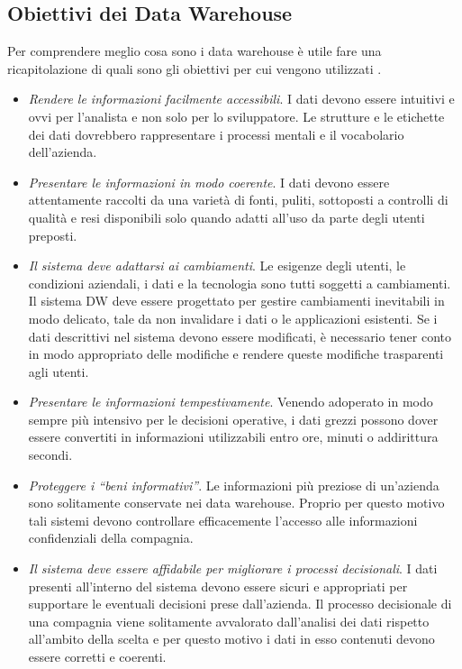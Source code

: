 \subsection{Obiettivi dei Data Warehouse}
Per comprendere meglio cosa sono i data warehouse è utile fare una ricapitolazione di quali sono gli obiettivi per cui vengono utilizzati \cite{kimball_the_data_warehouse_toolkit}.

\begin{itemize}
    \item \textit{Rendere le informazioni facilmente accessibili}. I dati devono essere intuitivi e ovvi per l'analista e non solo per lo sviluppatore. Le strutture e le etichette dei dati dovrebbero rappresentare i processi mentali e il vocabolario dell'azienda. 
    \item \textit{Presentare le informazioni in modo coerente}. I dati devono essere attentamente raccolti da una varietà di fonti, puliti, sottoposti a controlli di qualità e resi disponibili solo quando adatti all'uso da parte degli utenti preposti.
    \item \textit{Il sistema deve adattarsi ai cambiamenti}. Le esigenze degli utenti, le condizioni aziendali, i dati e la tecnologia sono tutti soggetti a cambiamenti. Il sistema DW deve essere progettato per gestire cambiamenti inevitabili in modo delicato, tale da non invalidare i dati o le applicazioni esistenti. Se i dati descrittivi nel sistema devono essere modificati, è necessario tener conto in modo appropriato delle modifiche e rendere queste modifiche trasparenti agli utenti.
    \item \textit{Presentare le informazioni tempestivamente}. Venendo adoperato in modo sempre più intensivo per le decisioni operative, i dati grezzi possono dover essere convertiti in informazioni utilizzabili entro ore, minuti o addirittura secondi.
    \item \textit{Proteggere i “beni informativi”}. Le informazioni più preziose di un'azienda sono solitamente conservate nei data warehouse. Proprio per questo motivo tali sistemi devono controllare efficacemente l'accesso alle informazioni confidenziali della compagnia.
    \item \textit{Il sistema deve essere affidabile per migliorare i processi decisionali}. I dati presenti all'interno del sistema devono essere sicuri e appropriati per supportare le eventuali decisioni prese dall'azienda. Il processo decisionale di una compagnia viene solitamente avvalorato dall'analisi dei dati rispetto all'ambito della scelta e per questo motivo i dati in esso contenuti devono essere corretti e coerenti.
\end{itemize}

